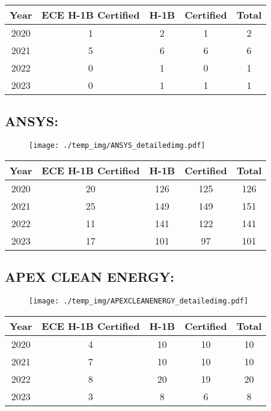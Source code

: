\documentclass{article}%
\begin{document}
%
\begin{longtable}{c|c|c|c|c}%
\hline%
Year&ECE H{-}1B Certified&H{-}1B&Certified&Total\\%
\hline%
2020&1&2&1&2\\%
\hline%
2021&5&6&6&6\\%
\hline%
2022&0&1&0&1\\%
\hline%
2023&0&1&1&1\\%
\hline%
\end{longtable}

%
\newpage%
\subsection{ANSYS:}%
\label{subsec:ANSYS}%
\label{ANSYSdetailed}%


\begin{figure}[htbp]%
\centering%
\texttt{[image: ./temp\_img/ANSYS\_detailedimg.pdf]}%
\end{figure}

%
\begin{longtable}{c|c|c|c|c}%
\hline%
Year&ECE H{-}1B Certified&H{-}1B&Certified&Total\\%
\hline%
2020&20&126&125&126\\%
\hline%
2021&25&149&149&151\\%
\hline%
2022&11&141&122&141\\%
\hline%
2023&17&101&97&101\\%
\hline%
\end{longtable}

%
\newpage%
\subsection{APEX CLEAN ENERGY:}%
\label{subsec:APEXCLEANENERGY}%
\label{APEXCLEANENERGYdetailed}%


\begin{figure}[htbp]%
\centering%
\texttt{[image: ./temp\_img/APEXCLEANENERGY\_detailedimg.pdf]}%
\end{figure}

%
\begin{longtable}{c|c|c|c|c}%
\hline%
Year&ECE H{-}1B Certified&H{-}1B&Certified&Total\\%
\hline%
2020&4&10&10&10\\%
\hline%
2021&7&10&10&10\\%
\hline%
2022&8&20&19&20\\%
\hline%
2023&3&8&6&8\\%
\hline%
\end{longtable}
\end{document}

